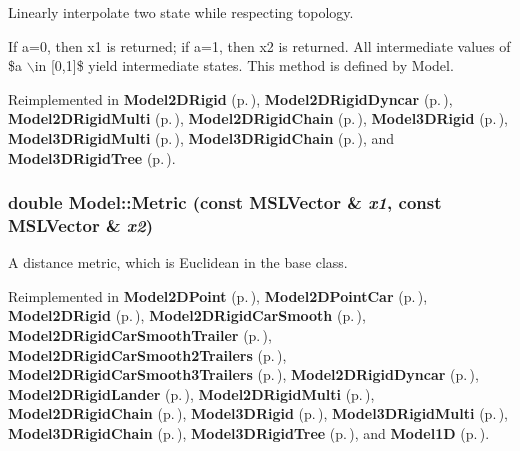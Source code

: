 Linearly interpolate two state while respecting topology.

If a=0, then x1 is returned; if a=1, then x2 is returned. All intermediate values of \$a $\backslash$in [0,1]\$ yield intermediate states. This method is defined by Model. 

Reimplemented in {\bf Model2DRigid} {\rm (p.\,\pageref{class_Model2DRigid_a4})}, {\bf Model2DRigid\-Dyncar} {\rm (p.\,\pageref{class_Model2DRigidDyncar_a6})}, {\bf Model2DRigid\-Multi} {\rm (p.\,\pageref{class_Model2DRigidMulti_a4})}, {\bf Model2DRigid\-Chain} {\rm (p.\,\pageref{class_Model2DRigidChain_a4})}, {\bf Model3DRigid} {\rm (p.\,\pageref{class_Model3DRigid_a5})}, {\bf Model3DRigid\-Multi} {\rm (p.\,\pageref{class_Model3DRigidMulti_a3})}, {\bf Model3DRigid\-Chain} {\rm (p.\,\pageref{class_Model3DRigidChain_a4})}, and {\bf Model3DRigid\-Tree} {\rm (p.\,\pageref{class_Model3DRigidTree_a4})}.
\subsubsection{\setlength{\rightskip}{0pt plus 5cm}double Model::Metric (const {\bf MSLVector} \& {\em x1}, const {\bf MSLVector} \& {\em x2})\hspace{0.3cm}{\tt  [virtual]}}\label{class_Model_a9}


A distance metric, which is Euclidean in the base class.



Reimplemented in {\bf Model2DPoint} {\rm (p.\,\pageref{class_Model2DPoint_a4})}, {\bf Model2DPoint\-Car} {\rm (p.\,\pageref{class_Model2DPointCar_a4})}, {\bf Model2DRigid} {\rm (p.\,\pageref{class_Model2DRigid_a5})}, {\bf Model2DRigid\-Car\-Smooth} {\rm (p.\,\pageref{class_Model2DRigidCarSmooth_a4})}, {\bf Model2DRigid\-Car\-Smooth\-Trailer} {\rm (p.\,\pageref{class_Model2DRigidCarSmoothTrailer_a3})}, {\bf Model2DRigid\-Car\-Smooth2Trailers} {\rm (p.\,\pageref{class_Model2DRigidCarSmooth2Trailers_a3})}, {\bf Model2DRigid\-Car\-Smooth3Trailers} {\rm (p.\,\pageref{class_Model2DRigidCarSmooth3Trailers_a3})}, {\bf Model2DRigid\-Dyncar} {\rm (p.\,\pageref{class_Model2DRigidDyncar_a5})}, {\bf Model2DRigid\-Lander} {\rm (p.\,\pageref{class_Model2DRigidLander_a5})}, {\bf Model2DRigid\-Multi} {\rm (p.\,\pageref{class_Model2DRigidMulti_a2})}, {\bf Model2DRigid\-Chain} {\rm (p.\,\pageref{class_Model2DRigidChain_a5})}, {\bf Model3DRigid} {\rm (p.\,\pageref{class_Model3DRigid_a4})}, {\bf Model3DRigid\-Multi} {\rm (p.\,\pageref{class_Model3DRigidMulti_a2})}, {\bf Model3DRigid\-Chain} {\rm (p.\,\pageref{class_Model3DRigidChain_a5})}, {\bf Model3DRigid\-Tree} {\rm (p.\,\pageref{class_Model3DRigidTree_a5})}, and {\bf Model1D} {\rm (p.\,\pageref{class_Model1D_a5})}.
